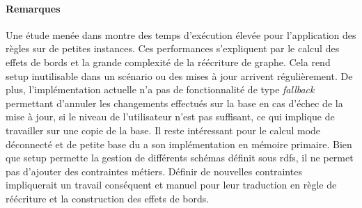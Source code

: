 \paragraph{Remarques}
Une étude menée dans \cite{chabinGraphRewritingSystem2020,chabinGraphRewritingRules2021} montre des temps d'exécution élevée pour l'application des règles sur de petites instances.
Ces performances s'expliquent par le calcul des effets de bords et la grande complexité de la réécriture de graphe.
Cela rend \gls{setup} inutilisable dans un scénario ou des mises à jour arrivent régulièrement.
De plus, l'implémentation actuelle n'a pas de fonctionnalité de type \emph{fallback} permettant d'annuler les changements effectués sur la base en cas d'échec de la mise à jour, si le niveau de l'utilisateur n'est pas suffisant, ce qui implique de travailler sur une copie de la base.
Il reste intéressant pour le calcul mode déconnecté et de petite base du a son implémentation en mémoire primaire.
Bien que \gls{setup} permette la gestion de différents schémas définit sous \gls{rdfs}, il ne permet pas d'ajouter des contraintes métiers.
Définir de nouvelles contraintes impliquerait un travail conséquent et manuel pour leur traduction en règle de réécriture et la construction des effets de bords.
